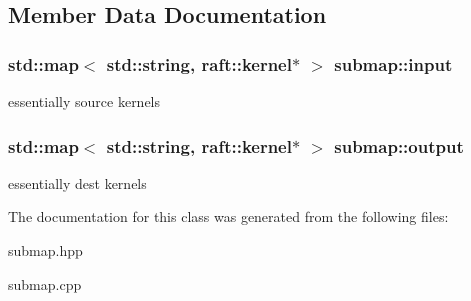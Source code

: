 \subsection{Member Data Documentation}
\hypertarget{classsubmap_a5623479b44a75778beda5bfc63441edb}{}
\subsubsection[{input}]{\setlength{\rightskip}{0pt plus 5cm}std\+::map$<$ std\+::string, {\bf raft\+::kernel}$\ast$ $>$ submap\+::input\hspace{0.3cm}{\ttfamily [protected]}}\label{classsubmap_a5623479b44a75778beda5bfc63441edb}
essentially source kernels \hypertarget{classsubmap_a668f86fc580ad8d9a6886af0615de96a}{}
\subsubsection[{output}]{\setlength{\rightskip}{0pt plus 5cm}std\+::map$<$ std\+::string, {\bf raft\+::kernel}$\ast$ $>$ submap\+::output\hspace{0.3cm}{\ttfamily [protected]}}\label{classsubmap_a668f86fc580ad8d9a6886af0615de96a}
essentially dest kernels 

The documentation for this class was generated from the following files\+:\begin{DoxyCompactItemize}
\item 
submap.\+hpp\item 
submap.\+cpp\end{DoxyCompactItemize}
